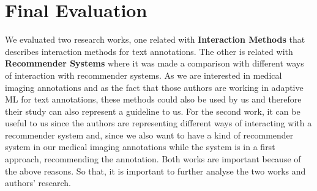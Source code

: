 \section{Final Evaluation}

We evaluated two research works, one related with \textbf{Interaction Methods} \cite{yimam2015interactive} that describes interaction methods for text annotations. The other is related with \textbf{Recommender Systems} \cite{knijnenburg2011each} where it was made a comparison with different ways of interaction with recommender systems. As we are interested in medical imaging annotations and as the fact that those authors are working in adaptive ML for text annotations, these methods could also be used by us and therefore their study can also represent a guideline to us. For the second work, it can be useful to us since the authors are representing different ways of interacting with a recommender system and, since we also want to have a kind of recommender system in our medical imaging annotations while the system is in a first approach, recommending the annotation. Both works are important because of the above reasons. So that, it is important to further analyse the two works and authors' research.